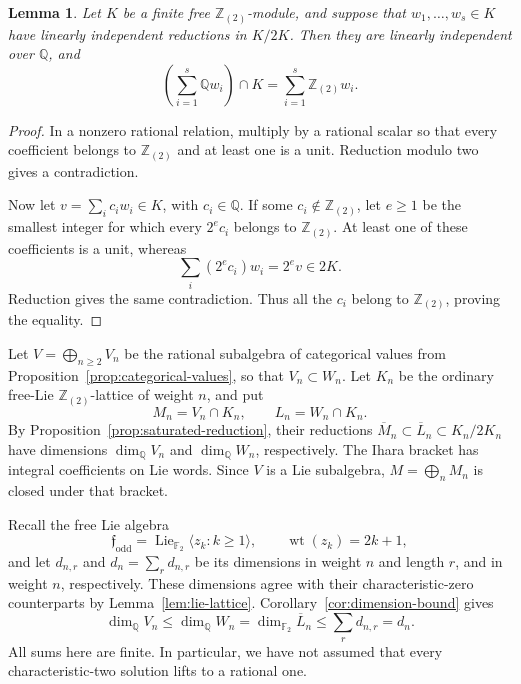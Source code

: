 \documentclass[11pt]{article}
\newtheorem{lemma}[theorem]{Lemma}
\theoremstyle{definition}
\theoremstyle{remark}
\numberwithin{equation}{section}
\begin{document}
\begin{lemma}\label{lem:hall-saturation}
Let \(K\) be a finite free \(\mathbb Z_{(2)}\)-module, and suppose that
\(w_1,\ldots,w_s\in K\) have linearly independent reductions in
\(K/2K\).  Then they are linearly independent over \(\mathbb Q\), and
\[
 \left(\sum_{i=1}^s\mathbb Q w_i\right)\cap K
   =\sum_{i=1}^s\mathbb Z_{(2)}w_i.
\]
\end{lemma}
\begin{proof}
In a nonzero rational relation, multiply by a rational scalar so
that every coefficient belongs to \(\mathbb Z_{(2)}\) and at least one is
a unit.  Reduction modulo two gives a contradiction.

Now let \(v=\sum_i c_iw_i\in K\), with \(c_i\in\mathbb Q\).
If some \(c_i\notin\mathbb Z_{(2)}\), let \(e\ge1\) be the smallest integer
for which every \(2^ec_i\) belongs to \(\mathbb Z_{(2)}\).
At least one of these coefficients is a unit, whereas
\[
 \sum_i(2^ec_i)w_i=2^ev\in2K.
\]
Reduction gives the same contradiction.  Thus all the \(c_i\)
belong to \(\mathbb Z_{(2)}\), proving the equality.
\end{proof}

Let \(V=\bigoplus_{n\ge2}V_n\) be the rational subalgebra of
categorical values from Proposition~\ref{prop:categorical-values},
so that \(V_n\subset W_n\).
Let \(K_n\) be the ordinary free-Lie \(\mathbb Z_{(2)}\)-lattice of
weight \(n\), and put
\[
 M_n=V_n\cap K_n,\qquad L_n=W_n\cap K_n.
\]
By Proposition~\ref{prop:saturated-reduction}, their reductions
\(\overline M_n\subset\overline L_n\subset K_n/2K_n\) have
dimensions \(\dim_\mathbb Q V_n\) and \(\dim_\mathbb Q W_n\), respectively.
The Ihara bracket has integral coefficients on Lie words.
Since \(V\) is a Lie subalgebra, \(M=\bigoplus_n M_n\) is closed
under that bracket.

Recall the free Lie algebra
\[
 \mathfrak f_{\mathrm{odd}}
   =\operatorname{Lie}_{{\mathbb F_2}}\langle z_k:k\ge1\rangle,\qquad
 \operatorname{wt}(z_k)=2k+1,
\]
and let \(d_{n,r}\) and \(d_n=\sum_r d_{n,r}\) be its dimensions
in weight \(n\) and length \(r\), and in weight \(n\), respectively.
These dimensions agree with their characteristic-zero counterparts
by Lemma~\ref{lem:lie-lattice}.
Corollary~\ref{cor:dimension-bound} gives
\begin{equation}\label{eq:dimension-squeeze}
 \dim_\mathbb Q V_n
 \le \dim_\mathbb Q W_n
 =\dim_{\mathbb F_2}\overline L_n
 \le\sum_r d_{n,r}=d_n.
\end{equation}
All sums here are finite.  In particular, we have not assumed
that every characteristic-two solution lifts to a rational one.
\end{document}
